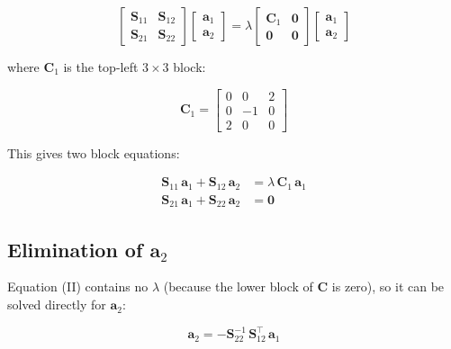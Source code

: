 \documentclass{article}
\begin{document}
	\begin{equation}
		\begin{bmatrix}
			\mathbf{S}_{11} & \mathbf{S}_{12} \\
			\mathbf{S}_{21} & \mathbf{S}_{22}
		\end{bmatrix}
		\begin{bmatrix} \mathbf{a}_1 \\ \mathbf{a}_2 \end{bmatrix}
		= \lambda
		\begin{bmatrix}
			\mathbf{C}_1 & \mathbf{0} \\
			\mathbf{0}   & \mathbf{0}
		\end{bmatrix}
		\begin{bmatrix} \mathbf{a}_1 \\ \mathbf{a}_2 \end{bmatrix}
	\end{equation}
	
	where $\mathbf{C}_1$ is the top-left $3\times3$ block:
	
	\begin{equation}
		\mathbf{C}_1 =
		\begin{bmatrix}
			0 & 0 & 2 \\
			0 &-1 & 0 \\
			2 & 0 & 0
		\end{bmatrix}
	\end{equation}
	
	This gives two block equations:
	
	\begin{align}
		\mathbf{S}_{11}\,\mathbf{a}_1 + \mathbf{S}_{12}\,\mathbf{a}_2
		&= \lambda\, \mathbf{C}_1\,\mathbf{a}_1
		\tag{I}\label{eq:blockI} \\[4pt]
		\mathbf{S}_{21}\,\mathbf{a}_1 + \mathbf{S}_{22}\,\mathbf{a}_2
		&= \mathbf{0}
		\tag{II}\label{eq:blockII}
	\end{align}
	
	\subsection{Elimination of $\mathbf{a}_2$}
	
	Equation (II) contains no $\lambda$ (because the lower block
	of $\mathbf{C}$ is zero), so it can be solved directly for $\mathbf{a}_2$:
	
	\begin{equation}
		\mathbf{a}_2 = -\mathbf{S}_{22}^{-1}\, \mathbf{S}_{12}^\top\, \mathbf{a}_1
		\label{eq:backsubst}
	\end{equation}
	
\end{document}
